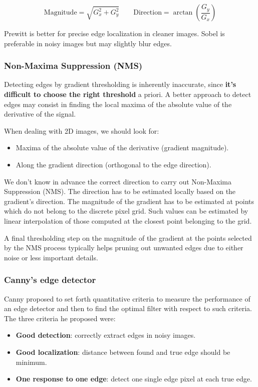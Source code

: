 \documentclass{article}
\begin{document}
$$\text{Magnitude} = \sqrt{G_x^2 + G_y^2} \quad\quad \text{Direction} = \arctan(\frac{G_y}{G_x})$$

Prewitt is better for precise edge localization in cleaner images.
Sobel is preferable in noisy images but may slightly blur edges.


\subsubsection{Non-Maxima Suppression (NMS)}

Detecting edges by gradient thresholding is inherently inaccurate, since \textbf{it's difficult to choose the right threshold} a priori.
A better approach to detect edges may consist in finding the local maxima of the absolute value of the derivative of the signal.

When dealing with 2D images, we should look for:
\begin{itemize}
  \item Maxima of the absolute value of the derivative (gradient magnitude).
  \item Along the gradient direction (orthogonal to the edge direction).
\end{itemize}

We don't know in advance the correct direction to carry out Non-Maxima Suppression (NMS).
The direction has to be estimated locally based on the gradient's direction.
The magnitude of the gradient has to be estimated at points which do not belong to the discrete pixel grid.
Such values can be estimated by linear interpolation of those computed at the closest point belonging to the grid.

A final thresholding step on the magnitude of the gradient at the points selected by the NMS process typically helps pruning out unwanted edges due to either noise or less important details.

\subsubsection{Canny's edge detector}
Canny proposed to set forth quantitative criteria to measure the performance of an edge detector and then to find the optimal filter with respect to such criteria.
The three criteria he proposed were:
\begin{itemize}
  \item \textbf{Good detection}: correctly extract edges in noisy images.
  \item \textbf{Good localization}: distance between found and true edge should be minimum.
  \item \textbf{One response to one edge}: detect one single edge pixel at each true edge.
\end{itemize}
\end{document}

